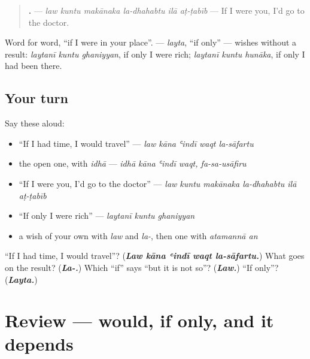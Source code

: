 \begin{grammarlens}[title={Grammar Lens: if I were you, and if only}]
\begin{quote}
\textbf{     .} — \emph{law kuntu makānaka la-dhahabtu ilā aṭ-ṭabīb} — If I were you, I'd go to the doctor.
\end{quote}

Word for word, \textquotedblleft{}if I were in your place\textquotedblright{}. \textbf{} — \emph{layta}, \textquotedblleft{}if only\textquotedblright{} — wishes without a result: \emph{laytanī kuntu ghaniyyan}, if only I were rich; \emph{laytanī kuntu hunāka}, if only I had been there.
\end{grammarlens}

\subsection*{Your turn}
Say these aloud:

\begin{itemize}
\raggedright
  \item \textquotedblleft{}If I had time, I would travel\textquotedblright{} — \emph{law kāna ʿindī waqt la-sāfartu}
  \item the open one, with \emph{idhā} — \emph{idhā kāna ʿindī waqt, fa-sa-usāfiru}
  \item \textquotedblleft{}If I were you, I'd go to the doctor\textquotedblright{} — \emph{law kuntu makānaka la-dhahabtu ilā aṭ-ṭabīb}
  \item \textquotedblleft{}If only I were rich\textquotedblright{} — \emph{laytanī kuntu ghaniyyan}
  \item a wish of your own with \emph{law} and \emph{la-}, then one with \emph{atamannā an}
\end{itemize}

\begin{tcolorbox}[breakable,colback=teal!4,colframe=teal!35!black,title={Before you move on}]
\textquotedblleft{}If I had time, I would travel\textquotedblright{}? (\emph{\textbf{Law kāna ʿindī waqt la-sāfartu.}}) What goes on the result? (\emph{\textbf{La-.}}) Which \textquotedblleft{}if\textquotedblright{} says \textquotedblleft{}but it is not so\textquotedblright{}? (\emph{\textbf{Law.}}) \textquotedblleft{}If only\textquotedblright{}? (\emph{\textbf{Layta.}})
\end{tcolorbox}
\section[(review)]{Review — would, if only, and it depends}

